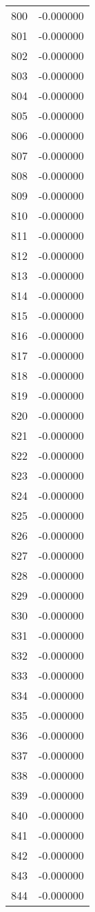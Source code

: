 \documentclass[12pt]{article}
\begin{document}
\begin{longtable}{@{}cc@{}}
800 & -0.000000 \\
801 & -0.000000 \\
802 & -0.000000 \\
803 & -0.000000 \\
804 & -0.000000 \\
805 & -0.000000 \\
806 & -0.000000 \\
807 & -0.000000 \\
808 & -0.000000 \\
809 & -0.000000 \\
810 & -0.000000 \\
811 & -0.000000 \\
812 & -0.000000 \\
813 & -0.000000 \\
814 & -0.000000 \\
815 & -0.000000 \\
816 & -0.000000 \\
817 & -0.000000 \\
818 & -0.000000 \\
819 & -0.000000 \\
820 & -0.000000 \\
821 & -0.000000 \\
822 & -0.000000 \\
823 & -0.000000 \\
824 & -0.000000 \\
825 & -0.000000 \\
826 & -0.000000 \\
827 & -0.000000 \\
828 & -0.000000 \\
829 & -0.000000 \\
830 & -0.000000 \\
831 & -0.000000 \\
832 & -0.000000 \\
833 & -0.000000 \\
834 & -0.000000 \\
835 & -0.000000 \\
836 & -0.000000 \\
837 & -0.000000 \\
838 & -0.000000 \\
839 & -0.000000 \\
840 & -0.000000 \\
841 & -0.000000 \\
842 & -0.000000 \\
843 & -0.000000 \\
844 & -0.000000 \\

\end{longtable}
\end{document}
